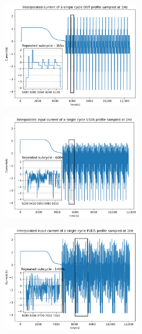 \begin{figure}[H] %
    \begin{subfigure}[b]{0.45\textwidth}
        \includegraphics[width=6cm]{II_Body/images/Current-DST.png}
        \caption{\centering}
        \label{subfig:profs-DST}
    \end{subfigure}
    \vspace{1pc}
    \begin{subfigure}[b]{0.45\textwidth}
        \includegraphics[width=6cm]{II_Body/images/Current-US06.png}
        \caption{\centering}
        \label{subfig:profs-US}
    \end{subfigure}
    \vspace{1pc}
    \begin{subfigure}[b]{0.45\textwidth}
        \includegraphics[width=6cm]{II_Body/images/Current-FUDS.png}
        \caption{\centering}
        \label{subfig:profs-FUDS}
    \end{subfigure}    

\end{figure}
